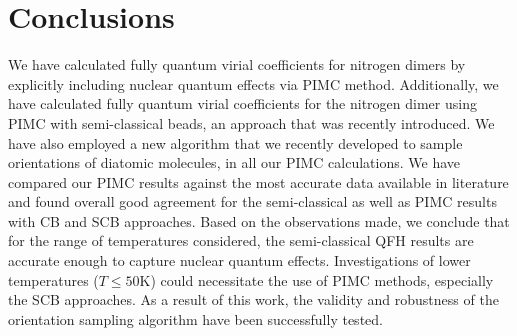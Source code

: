     \section{Conclusions}
    \label{sec:conclusion}
        We have calculated fully quantum virial coefficients for nitrogen dimers by explicitly including nuclear quantum effects via PIMC method. Additionally, we have calculated fully quantum virial coefficients for the nitrogen dimer using PIMC with semi-classical beads, an approach that was recently \cite{Fomms2016} introduced. We have also employed a new algorithm that we recently \cite{hydrogen} developed to sample orientations of diatomic molecules, in all our PIMC calculations. We have compared our PIMC results against the most accurate data available in literature and found overall good agreement for the semi-classical as well as PIMC results with CB and SCB approaches. Based on the observations made, we conclude that for the range of temperatures considered, the semi-classical QFH results are accurate enough to capture nuclear quantum effects. Investigations of lower temperatures ($T \le 50$K) could necessitate the use of PIMC methods, especially the SCB approaches. As a result of this work, the validity and robustness of the orientation sampling algorithm \cite{hydrogen} have been successfully tested.

